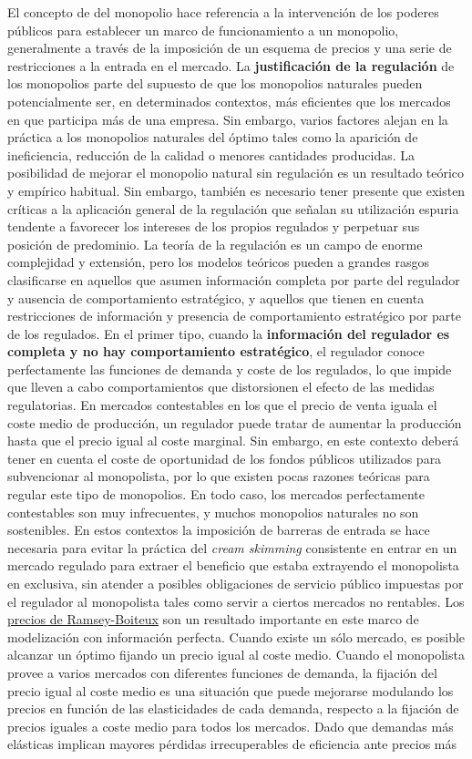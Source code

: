 \documentclass{nuevotema}
\begin{document}
El concepto de  del monopolio hace referencia a la intervención de los poderes públicos para establecer un marco de funcionamiento a un monopolio, generalmente a través de la imposición de un esquema de precios y una serie de restricciones a la entrada en el mercado. La \textbf{justificación de la regulación} de los monopolios parte del supuesto de que los monopolios naturales pueden potencialmente ser, en determinados contextos, más eficientes que los mercados en que participa más de una empresa. Sin embargo, varios factores alejan en la práctica a los monopolios naturales del óptimo tales como la aparición de ineficiencia, reducción de la calidad o menores cantidades producidas. La posibilidad de mejorar el monopolio natural sin regulación es un resultado teórico y empírico habitual. Sin embargo, también es necesario tener presente que existen críticas a la aplicación general de la regulación que señalan su utilización espuria tendente a favorecer los intereses de los propios regulados y perpetuar sus posición de predominio. La teoría de la regulación es un campo de enorme complejidad y extensión, pero los modelos teóricos pueden a grandes rasgos clasificarse en aquellos que asumen información completa por parte del regulador y ausencia de comportamiento estratégico, y aquellos que tienen en cuenta restricciones de información y presencia de comportamiento estratégico por parte de los regulados. En el primer tipo, cuando la \textbf{información del regulador es completa y no hay comportamiento estratégico}, el regulador conoce perfectamente las funciones de demanda y coste de los regulados, lo que impide que lleven a cabo comportamientos que distorsionen el efecto de las medidas regulatorias. En mercados contestables en los que el precio de venta iguala el coste medio de producción, un regulador puede tratar de aumentar la producción hasta que el precio igual al coste marginal. Sin embargo, en este contexto deberá tener en cuenta el coste de oportunidad de los fondos públicos utilizados para subvencionar al monopolista, por lo que existen pocas razones teóricas para regular este tipo de monopolios. En todo caso, los mercados perfectamente contestables son muy infrecuentes, y muchos monopolios naturales no son sostenibles. En estos contextos la imposición de barreras de entrada se hace necesaria para evitar la práctica del \textit{cream skimming} consistente en entrar en un mercado regulado para extraer el beneficio que estaba extrayendo el monopolista en exclusiva, sin atender a posibles obligaciones de servicio público impuestas por el regulador al monopolista tales como servir a ciertos mercados no rentables. Los \underline{precios de Ramsey-Boiteux} son un resultado importante en este marco de modelización con información perfecta. Cuando existe un sólo mercado, es posible alcanzar un óptimo fijando un precio igual al coste medio. Cuando el monopolista provee a varios mercados con diferentes funciones de demanda, la fijación del precio igual al coste medio es una situación que puede mejorarse modulando los precios en función de las elasticidades de cada demanda, respecto a la fijación de precios iguales a coste medio para todos los mercados. Dado que demandas más elásticas implican mayores pérdidas irrecuperables de eficiencia ante precios más 
\end{document}
